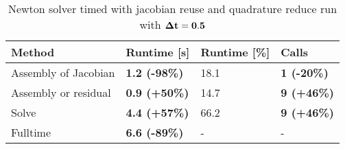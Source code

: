 \begin{table}[H]
\centering
\caption{Newton solver timed with jacobian reuse and quadrature reduce run with $\bold{\Delta t = 0.5}$}
\label{both_tech}
\begin{tabular}{|l|l|l|l|}
\hline
Method & \textbf{Runtime {[}s{]}} & Runtime {[}\%{]} & \textbf{Calls} \\ \hline
Assembly of Jacobian & \textbf{1.2 (-98\%)} & 18.1 & \textbf{1 (-20\%)} \\ \hline
Assembly or residual & \textbf{0.9 (+50\%)} & 14.7 & \textbf{9 (+46\%)} \\ \hline
Solve & \textbf{4.4 (+57\%)} & 66.2 & \textbf{9 (+46\%)} \\ \hline
Fulltime & \textbf{6.6 (-89\%)} & - & - \\ \hline
\end{tabular}
\end{table}








